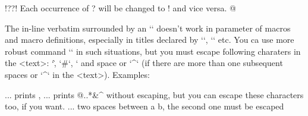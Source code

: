 \begtt   \adef@{\string\endtt}
\begtt   \adef!{?}\adef?{!}
Each occurrence of ? will be changed to ! and vice versa. 
@
\endtt

The in-line verbatim surrounded by an `\activettchar` doesn't work in
parameter of macros and macro definitions, especially in titles declared by
`\chap`, `\sec` etc. 
\new
You ca use more robust command `` in such
situations, but you must escape following charaters in the <text>:
`\`, `#`, `%
and space or `^` (if there are more than one subsequent spaces or `^` in 
the <text>). Examples:

\begtt
\code{\\text, \%\#} ... prints \text, %
  ... prints @{..}*&^$ $ without escaping, but you can
                        escape these characters too, if you want.
        ... two spaces between a  b, the second one must be escaped
